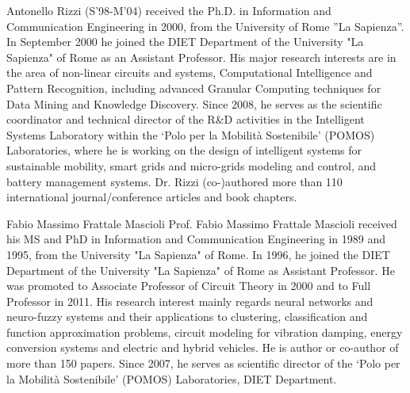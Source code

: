 \documentclass[journal]{IEEEtran}
\begin{document}
\begin{IEEEbiography}[{\texttt{[image: AR]}}]{Antonello Rizzi} 
(S’98-M’04) received the Ph.D. in Information and Communication Engineering in 2000, from the University of Rome ”La Sapienza”. In September 2000 he joined the DIET Department of the University "La Sapienza" of Rome as an Assistant Professor. His major research interests are in the area of non-linear circuits and systems, Computational Intelligence and Pattern Recognition, including advanced Granular Computing techniques for Data Mining and Knowledge Discovery. Since 2008, he serves as the scientiﬁc coordinator and technical director of the R\&D activities in the Intelligent Systems Laboratory within the `Polo per la Mobilit\`{a} Sostenibile' (POMOS) Laboratories, where he is working on the design of intelligent systems for sustainable mobility, smart grids and micro-grids modeling and control, and battery management systems. Dr. Rizzi (co-)authored more than 110 international journal/conference articles and book chapters.
\end{IEEEbiography}
\begin{IEEEbiography}{Fabio Massimo Frattale Mascioli} 
Prof. Fabio Massimo Frattale Mascioli received his MS and PhD in Information and Communication Engineering in 1989 and 1995, from the University "La Sapienza" of Rome. In 1996, he joined the DIET Department of the University "La Sapienza" of Rome as Assistant Professor. He was promoted to Associate Professor of Circuit Theory in 2000 and to Full Professor in 2011. His research interest mainly regards neural networks and neuro-fuzzy systems and their applications to clustering, classification and function approximation problems, circuit modeling for vibration damping, energy conversion systems and electric and hybrid vehicles. He is author or co-author of more than 150 papers. Since 2007, he serves as scientific director of the `Polo per la Mobilit\`{a} Sostenibile' (POMOS) Laboratories, DIET Department.
\end{IEEEbiography}
\end{document}

